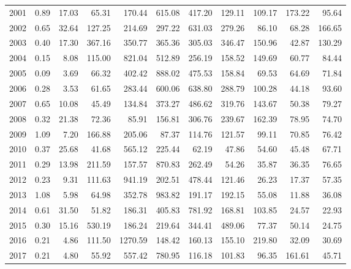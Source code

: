 \documentclass[]{article}
\begin{document}
\begin{table}[ht]
{\begin{tabular}{rrrrrrrrrrr}
  2001 & 0.89 & 17.03 & 65.31 & 170.44 & 615.08 & 417.20 & 129.11 & 109.17 & 173.22 & 95.64 \\ 
  2002 & 0.65 & 32.64 & 127.25 & 214.69 & 297.22 & 631.03 & 279.26 & 86.10 & 68.28 & 166.65 \\ 
  2003 & 0.40 & 17.30 & 367.16 & 350.77 & 365.36 & 305.03 & 346.47 & 150.96 & 42.87 & 130.29 \\ 
  2004 & 0.15 & 8.08 & 115.00 & 821.04 & 512.89 & 256.19 & 158.52 & 149.69 & 60.77 & 84.44 \\ 
  2005 & 0.09 & 3.69 & 66.32 & 402.42 & 888.02 & 475.53 & 158.84 & 69.53 & 64.69 & 71.84 \\ 
  2006 & 0.28 & 3.53 & 61.65 & 283.44 & 600.06 & 638.80 & 288.79 & 100.28 & 44.18 & 93.60 \\ 
  2007 & 0.65 & 10.08 & 45.49 & 134.84 & 373.27 & 486.62 & 319.76 & 143.67 & 50.38 & 79.27 \\ 
  2008 & 0.32 & 21.38 & 72.36 & 85.91 & 156.81 & 306.76 & 239.67 & 162.39 & 78.95 & 74.70 \\ 
  2009 & 1.09 & 7.20 & 166.88 & 205.06 & 87.37 & 114.76 & 121.57 & 99.11 & 70.85 & 76.42 \\ 
  2010 & 0.37 & 25.68 & 41.68 & 565.12 & 225.44 & 62.19 & 47.86 & 54.60 & 45.48 & 67.71 \\ 
  2011 & 0.29 & 13.98 & 211.59 & 157.57 & 870.83 & 262.49 & 54.26 & 35.87 & 36.35 & 76.65 \\ 
  2012 & 0.23 & 9.31 & 111.63 & 941.19 & 202.51 & 478.44 & 121.46 & 26.23 & 17.37 & 57.35 \\ 
  2013 & 1.08 & 5.98 & 64.98 & 352.78 & 983.82 & 191.17 & 192.15 & 55.08 & 11.88 & 36.08 \\ 
  2014 & 0.61 & 31.50 & 51.82 & 186.31 & 405.83 & 781.92 & 168.81 & 103.85 & 24.57 & 22.93 \\ 
  2015 & 0.30 & 15.16 & 530.19 & 186.24 & 219.64 & 344.41 & 489.06 & 77.37 & 50.14 & 24.75 \\ 
  2016 & 0.21 & 4.86 & 111.50 & 1270.59 & 148.42 & 160.13 & 155.10 & 219.80 & 32.09 & 30.69 \\ 
  2017 & 0.21 & 4.80 & 55.92 & 557.42 & 780.95 & 116.18 & 101.83 & 96.35 & 161.61 & 45.71 \\ 
   \hline
\end{tabular}
}
\end{table}
\end{document}

